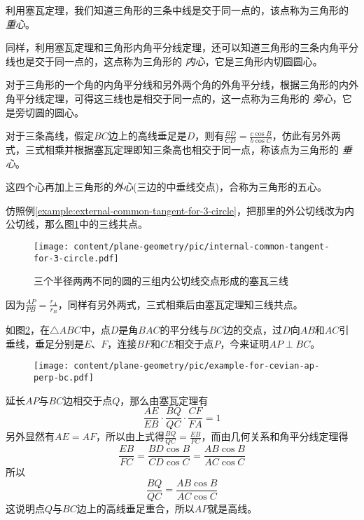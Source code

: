 \begin{example}[三角形的几个心]
 利用塞瓦定理，我们知道三角形的三条中线是交于同一点的，该点称为三角形的 \emph{重心}。

 同样，利用塞瓦定理和三角形内角平分线定理，还可以知道三角形的三条内角平分线也是交于同一点的，这点称为三角形的 \emph{内心}，它是三角形内切圆圆心。

 对于三角形的一个角的内角平分线和另外两个角的外角平分线，根据三角形的内外角平分线定理，可得这三线也是相交于同一点的，这一点称为三角形的 \emph{旁心}，它是旁切圆的圆心。

 对于三条高线，假定$BC$边上的高线垂足是$D$，则有$\frac{BD}{CD}=\frac{c \cos{B}}{b \cos{C}}$，仿此有另外两式，三式相乘并根据塞瓦定理即知三条高也相交于同一点，称该点为三角形的 \emph{垂心}。

这四个心再加上三角形的\emph{外心}(三边的中垂线交点)，合称为三角形的五心。 
\end{example}

\begin{example}
  仿照例\ref{example:external-common-tangent-for-3-circle}，把那里的外公切线改为内公切线，那么图\ref{fig:internal-common-tangent-for-3-circle}中的三线共点。
 
\begin{figure}[htbp]
\centering
\texttt{[image: content/plane-geometry/pic/internal-common-tangent-for-3-circle.pdf]}
\caption{三个半径两两不同的圆的三组内公切线交点形成的塞瓦三线}
\label{fig:internal-common-tangent-for-3-circle}
\end{figure}

因为$\frac{AP}{PB}=\frac{r_A}{r_B}$，同样有另外两式，三式相乘后由塞瓦定理知三线共点。
\end{example}

\begin{example}
  如图\ref{fig:example-for-cevian-ap-perp-bc}，在$\triangle ABC$中，点$D$是角$BAC$的平分线与$BC$边的交点，过$D$向$AB$和$AC$引垂线，垂足分别是$E$、$F$，连接$BF$和$CE$相交于点$P$，今来证明$AP \perp BC$。

\begin{figure}[htbp]
\centering
\texttt{[image: content/plane-geometry/pic/example-for-cevian-ap-perp-bc.pdf]}
\caption{}
\label{fig:example-for-cevian-ap-perp-bc}
\end{figure}

延长$AP$与$BC$边相交于点$Q$，那么由塞瓦定理有
\begin{equation*}
  \frac{AE}{EB} \cdot \frac{BQ}{QC} \cdot \frac{CF}{FA} = 1
\end{equation*}
另外显然有$AE=AF$，所以由上式得$\frac{BQ}{QC}=\frac{EB}{FC}$，而由几何关系和角平分线定理得
\begin{equation*}
  \frac{EB}{FC} = \frac{BD \cos{B}}{CD \cos{C}} = \frac{AB \cos{B}}{AC \cos{C}}
\end{equation*}
所以
\begin{equation*}
  \frac{BQ}{QC} = \frac{AB \cos{B}}{AC \cos{C}}
\end{equation*}
这说明点$Q$与$BC$边上的高线垂足重合，所以$AP$就是高线。
\end{example}

